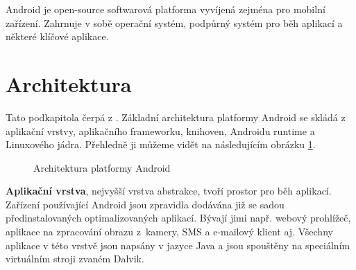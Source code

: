 Android je open-source softwarová platforma vyvíjená zejména pro mobilní
zařízení. Zahrnuje v sobě operační systém, podpůrný systém pro běh aplikací 
a některé klíčové aplikace.

\section{Architektura}
\label{AndroidArchitektura}

Tato podkapitola čerpá z \cite{whatISAndroid}. Základní
architektura platformy Android se skládá z aplikační vrstvy, aplikačního frameworku, knihoven, Androidu runtime a Linuxového jádra.
Přehledně ji můžeme vidět na následujícím obrázku \ref{AndroidArchitecture}.

\begin{figure}[H]
  \begin{center}
    \caption{Architektura platformy Android \cite{AndroidProfessionals}}
    \label{AndroidArchitecture}
  \end{center}
\end{figure}

\textbf{Aplikační vrstva}, nejvyšší vrstva abstrakce, tvoří prostor pro běh
aplikací. Zařízení používající Android jsou zpravidla dodávána již se sadou
předinstalovaných optimalizovaných aplikací. Bývají jimi např. webový prohlížeč, aplikace na zpracování obrazu z~kamery, SMS a e-mailový klient aj. Všechny aplikace v této vrstvě jsou napsány v jazyce Java a jsou spouštěny na speciálním virtuálním stroji zvaném Dalvik.

